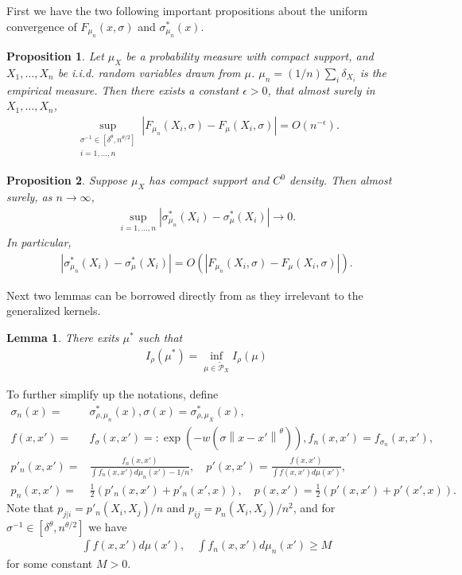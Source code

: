 \documentclass[10pt]{article}
\newcommand{\norm}[1]{\left\lVert#1\right\rVert}
\newtheorem{lemma}{\bf Lemma}
\newtheorem{proposition}{\bf Proposition}
\newenvironment{Proof of lemma}{\noindent{\bf Proof of Lemma}}{\hfill$\Box$\newline}
\newenvironment{Proof of claim}{\noindent{\bf Proof of claim}}{\hfill$\Box$\newline}
\newenvironment{Proof of theorem}{\noindent{\bf Proof of Theorem}}{\hfill\scriptsize{$\Box$}\newline}
\newenvironment{Proof of theorems}{\noindent{\bf Proof of Theorems}}{\hfill$\Box$\newline}
\newenvironment{Proof of proposition}{\noindent{\bf Proof of Proposition}}{\hfill$\Box$\newline}
\newenvironment{Proof of propositions}{\noindent{\bf Proof of Propositions}}{\hfill$\Box$\newline}
\newenvironment{Proof of exercise}{\noindent{\it Proof of Exercise:}}{\hfill$\Box$}
\numberwithin{equation}{section}
\begin{document}
First we have the two following important propositions about the uniform
convergence of $F_{\mu_n}(x,\sigma)$ and $\sigma_{\mu_n}^*(x)$.
\begin{proposition} \label{tsne:uniform_convergence_prop}
    Let $\mu_X$ be a probability measure with compact support, and $X_1,\dots,X_n$ be i.i.d. random variables drawn from $\mu$. $\mu_n = (1/n)\sum_i \delta_{X_i}$ is the empirical measure. Then there exists a constant $\epsilon>0$, that almost surely in $X_1,\dots,X_n$,
    \begin{align}
        \sup_{\substack{\sigma^{-1} \in [\delta^{\theta},n^{\theta/2}] \\ i = 1,\dots, n}} \left|F_{\mu_n}(X_i,\sigma)-F_{\mu}(X_i,\sigma)\right| = O(n^{-\epsilon}).
    \end{align}
\end{proposition}
\begin{proposition} \label{tsne:uniform_convergence_prop_2}
    Suppose $\mu_X$ has compact support and $C^0$ density. Then almost surely, as $n \to \infty$,
    \begin{align}
        \sup_{i=1,\dots,n} \left|\sigma_{\mu_n}^*(X_i)-\sigma_{\mu}^*(X_i)\right| \to 0.
    \end{align}
    In particular,
    \begin{align}
        \left|\sigma_{\mu_n}^*(X_i)-\sigma_{\mu}^*(X_i)\right| = O\left(\left|F_{\mu_n}(X_i,\sigma)-F_{\mu}(X_i,\sigma)\right|\right).
    \end{align}
\end{proposition}
Next two lemmas can be borrowed directly from \cite{auffinger-tsne} as they irrelevant to the generalized kernels.
\begin{lemma} \label{mu_star_lemma}
    There exits $\mu^*$ such that
    \begin{align}
        I_{\rho}(\mu^*) = \inf_{\mu \in \tilde{\mathcal{P}}_X} I_{\rho}(\mu)
    \end{align}
\end{lemma}
To further simplify up the notations, define
\begin{align} \label{tsne:convergence_lemmas:notation}
    \sigma_n(x) = & \sigma_{\rho,\mu_n}^*(x), \sigma(x) = \sigma_{\rho,\mu_X}^*(x), \nonumber                                          \\
    f(x,x') =     & f_{\sigma}(x,x') =: \exp(-w(\sigma\norm{x-x'}^{\theta})), f_n(x,x') =  f_{\sigma_n}(x,x'), \nonumber               \\
    p'_n(x,x') =  & \frac{f_n(x,x')}{\int f_n(x,x')d\mu_n(x') - 1/n}, \quad p'(x,x') = \frac{f(x,x')}{\int f(x,x')d\mu(x')}, \nonumber \\
    p_n(x,x') =   & \frac{1}{2}(p'_n(x,x')+p'_n(x',x)), \quad p(x,x') = \frac{1}{2}(p'(x,x')+p'(x',x)).
\end{align}
Note that $p_{j|i} = p'_n(X_i,X_j)/n$ and $p_{ij} = p_n(X_i,X_j)/n^2$, and for $\sigma^{-1} \in [\delta^{\theta},n^{\theta/2}]$ we have
\begin{align} \label{tsne:important_bounds}
    \int f(x,x')d\mu(x'), \quad \int f_n(x,x')d\mu_n(x') \geq M
\end{align}
for some constant $M>0$.
\end{document}
